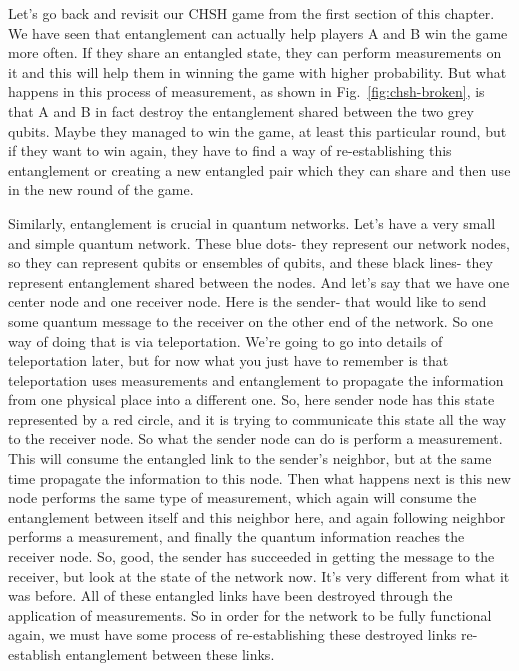 
Let's go back and revisit our CHSH game from the first section of this chapter. We have seen that entanglement can actually help players A and B win the game more often. If they share an entangled state, they can perform measurements on it and this will help them in winning the game with higher probability. But what happens in this process of measurement, as shown in Fig.~\ref{fig:chsh-broken}, is that A and B in fact destroy the entanglement shared between the two grey qubits.  Maybe they managed to win the game, at least this particular round, but if they want to win again, they have to find a way of re-establishing this entanglement or creating a new entangled pair which they can share and then use in the new round of the game. 

Similarly, entanglement is crucial in quantum networks. Let's have a very small and simple quantum network. These blue dots- they represent our network nodes, so they can represent qubits or ensembles of qubits, and these black lines- they represent entanglement shared between the nodes. And let's say that we have one center node and one receiver node. Here is the sender- that would like to send some quantum message to the receiver on the other end of the network. So one way of doing that is via teleportation. We're going to go into details of teleportation later, but for now what you just have to remember is that teleportation uses measurements and entanglement to propagate the information from one physical place into a different one. So, here sender node has this state represented by a red circle, and it is trying to communicate this state all the way to the receiver node. So what the sender node can do is perform a measurement. This will consume the entangled link to the sender's neighbor, but at the same time propagate the information to this node. Then what happens next is this new node performs the same type of measurement, which again will consume the entanglement between itself and this neighbor here, and again following neighbor performs a measurement, and finally the quantum information reaches the receiver node. So, good, the sender has succeeded in getting the message to the receiver, but look at the state of the network now. It's very different from what it was before. All of these entangled links have been destroyed through the application of measurements. So in order for the network to be fully functional again, we must have some process of re-establishing these destroyed links re-establish entanglement between these links.

